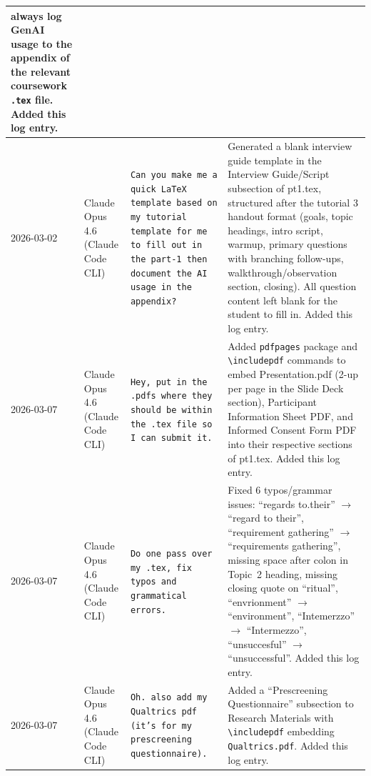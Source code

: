 \documentclass[a4paper,11pt]{article}
\begin{document}
\begin{longtable}{@{}p{1.8cm}p{2.8cm}p{4.5cm}p{4.5cm}@{}}
  always log GenAI usage to the appendix of the relevant coursework \texttt{.tex}
  file.  Added this log entry. \\
\midrule
2026-03-02
& Claude Opus 4.6 (Claude Code CLI)
& \texttt{Can you make me a quick LaTeX template based on my tutorial template
  for me to fill out in the part-1 then document the AI usage in the appendix?}
& Generated a blank interview guide template in the Interview Guide/Script
  subsection of pt1.tex, structured after the tutorial 3 handout format
  (goals, topic headings, intro script, warmup, primary questions with
  branching follow-ups, walkthrough/observation section, closing).
  All question content left blank for the student to fill in.
  Added this log entry. \\
\midrule
2026-03-07
& Claude Opus 4.6 (Claude Code CLI)
& \texttt{Hey, put in the .pdfs where they should be within the .tex file so I
  can submit it.}
& Added \texttt{pdfpages} package and \texttt{\textbackslash includepdf}
  commands to embed Presentation.pdf (2-up per page in the Slide Deck section),
  Participant Information Sheet PDF, and Informed Consent Form PDF into their
  respective sections of pt1.tex.  Added this log entry. \\
\midrule
2026-03-07
& Claude Opus 4.6 (Claude Code CLI)
& \texttt{Do one pass over my .tex, fix typos and grammatical errors.}
& Fixed 6 typos/grammar issues: ``regards to.their'' $\to$ ``regard to their'',
  ``requirement gathering'' $\to$ ``requirements gathering'',
  missing space after colon in Topic~2 heading,
  missing closing quote on ``ritual'',
  ``envrionment'' $\to$ ``environment'',
  ``Intemerzzo'' $\to$ ``Intermezzo'',
  ``unsuccesful'' $\to$ ``unsuccessful''.
  Added this log entry. \\
\midrule
2026-03-07
& Claude Opus 4.6 (Claude Code CLI)
& \texttt{Oh.\ also add my Qualtrics pdf (it's for my prescreening questionnaire).}
& Added a ``Prescreening Questionnaire'' subsection to Research Materials
  with \texttt{\textbackslash includepdf} embedding \texttt{Qualtrics.pdf}.
  Added this log entry. \\
\bottomrule
\end{longtable}
\end{document}
